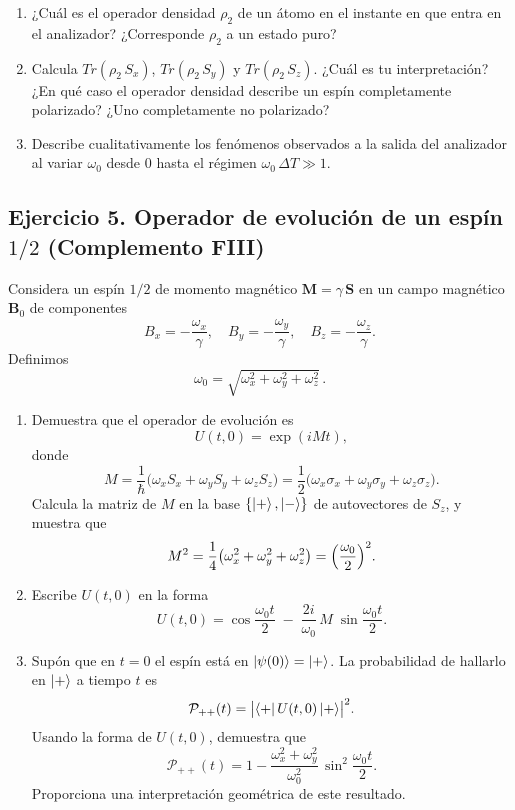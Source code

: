 \documentclass[a4paper,11pt]{article}
\begin{document}
\begin{enumerate}
  \begin{enumerate}
    \item ¿Cuál es el operador densidad \(\rho_2\) de un átomo en el instante en que entra en el analizador? ¿Corresponde \(\rho_2\) a un estado puro?
    \item Calcula \( Tr(\rho_2\,S_x)\), \( Tr(\rho_2\,S_y)\) y \( Tr(\rho_2\,S_z)\). ¿Cuál es tu interpretación? ¿En qué caso el operador densidad describe un espín completamente polarizado? ¿Uno completamente no polarizado?
    \item Describe cualitativamente los fenómenos observados a la salida del analizador al variar \(\omega_0\) desde \(0\) hasta el régimen \(\omega_0\,\Delta T\gg1\).
  \end{enumerate}

\end{enumerate}

\subsection*{Ejercicio 5. Operador de evolución de un espín \(1/2\) (Complemento FIII)}

Considera un espín \(1/2\) de momento magnético \(\mathbf{M}=\gamma\,\mathbf{S}\) en un campo magnético
\(\mathbf{B}_0\) de componentes
\[
B_x=-\frac{\omega_x}{\gamma},\quad
B_y=-\frac{\omega_y}{\gamma},\quad
B_z=-\frac{\omega_z}{\gamma}.
\]
Definimos 
\[
\omega_0=\sqrt{\omega_x^2+\omega_y^2+\omega_z^2}\,.
\]

\begin{enumerate}
\item Demuestra que el operador de evolución es
\[
U(t,0)=\exp(i M t),
\]
donde
\[
M=\frac{1}{\hbar}\bigl(\omega_x S_x+\omega_y S_y+\omega_z S_z\bigr)
=\frac12\bigl(\omega_x\sigma_x+\omega_y\sigma_y+\omega_z\sigma_z\bigr).
\]
Calcula la matriz de \(M\) en la base \(\{\ket{+},\ket{-}\}\) de autovectores de \(S_z\), y muestra que
\[
M^2=\frac14\bigl(\omega_x^2+\omega_y^2+\omega_z^2\bigr)
=\Bigl(\frac{\omega_0}{2}\Bigr)^2.
\]

\item Escribe \(U(t,0)\) en la forma
\[
U(t,0)=\cos\!\frac{\omega_0t}{2}
\;-\;\frac{2i}{\omega_0}\,M\;\sin\!\frac{\omega_0t}{2}.
\]

\item Supón que en \(t=0\) el espín está en \(\ket{\psi(0)}=\ket{+}\).  
La probabilidad de hallarlo en \(\ket{+}\) a tiempo \(t\) es
\[
\mathcal{P}_{++}(t)=\bigl|\bra{+}U(t,0)\ket{+}\bigr|^2.
\]
Usando la forma de \(U(t,0)\), demuestra que
\[
\mathcal{P}_{++}(t)
=1-\frac{\omega_x^2+\omega_y^2}{\omega_0^2}\,
\sin^2\!\frac{\omega_0 t}{2}.
\]
Proporciona una interpretación geométrica de este resultado.
\end{enumerate}
\end{document}
